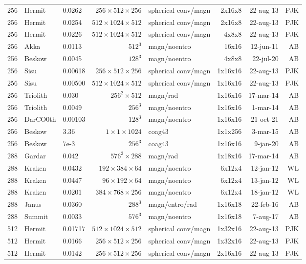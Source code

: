 \documentclass[\mydriver,12pt,twoside,notitlepage,a4paper]{article}
\begin{document}
\begin{center}
\begin{footnotesize}
\begin{longtable}{rllrlrrr}
 256 &Hermit&0.0262&$256{\!\times\!}512{\!\times\!}256$&spherical conv/magn&2x16x8&22-aug-13&PJK\\
 256 &Hermit&0.0254&$512{\!\times\!}1024{\!\times\!}512$&spherical conv/magn&2x16x8&22-aug-13&PJK\\
 256 &Hermit&0.0226&$512{\!\times\!}1024{\!\times\!}512$&spherical conv/magn&4x8x8&22-aug-13&PJK\\
 256 & Akka  &0.0113& $512^3$ & magn/noentro & 16x16  & 12-jun-11 & AB \\
 256 &Beskow &0.0045& $128^3$ & magn/noentro & 4x8x8 & 22-jul-20 & AB \\
 256 &Sisu&0.00618&$256{\!\times\!}512{\!\times\!}256$&spherical conv/magn&1x16x16&22-aug-13&PJK\\
 256 &Sisu&0.00500&$512{\!\times\!}1024{\!\times\!}512$&spherical conv/magn&1x16x16&22-aug-13&PJK\\
 256 &Triolith&0.030&$256^2\times512$ & magn/rad & 1x16x16& 17-mar-14 & AB \\
 256 &Triolith&0.0049&$256^3$ & magn/noentro & 1x16x16&  1-mar-14 & AB \\
 256 &DarCO0th&0.00103&$128^3$& magn/noentro & 1x16x16& 21-oct-21 & AB \\
 256&Beskow&3.36&$1{\!\times\!}1{\!\times\!}1024$&coag43&1x1x256&3-mar-15& AB \\
 256&Beskow&7e-3&$256^3$&coag43&1x16x16&9-jan-20& AB \\
 288 &Gardar&0.042&$576^2{\!\times\!}288$ & magn/rad & 1x18x16 & 17-mar-14&AB\\
 288 &Kraken&0.0432&$192{\!\times\!}384{\!\times\!}64$&magn/noentro&6x12x4&12-jan-12&WL\\
 288 & Kraken& 0.0447  &$96{\!\times\!}192{\!\times\!}64$ & magn/noentro & 6x12x4 &13-jan-12 & WL\\
 288 & Kraken& 0.0201  &$384{\!\times\!}768{\!\times\!}256$ & magn/noentro & 6x12x4 &18-jan-12 & WL\\
 288 & Janus &0.0360& $288^3$ &magn/entro/rad& 1x16x18 &22-feb-16 & AB \\
 288 &Summit &0.0033& $576^3$ & magn/noentro & 1x16x18&  7-aug-17 & AB \\ %
 512 &Hermit&0.01717&$512{\!\times\!}1024{\!\times\!}512$&spherical conv/magn&1x32x16&22-aug-13&PJK\\
 512 &Hermit&0.0166&$256{\!\times\!}512{\!\times\!}256$&spherical conv/magn&1x32x16&22-aug-13&PJK\\
 512 &Hermit&0.0142&$256{\!\times\!}512{\!\times\!}256$&spherical conv/magn&2x16x16&22-aug-13&PJK\\

\end{longtable}
\end{footnotesize}
\end{center}
\end{document}
